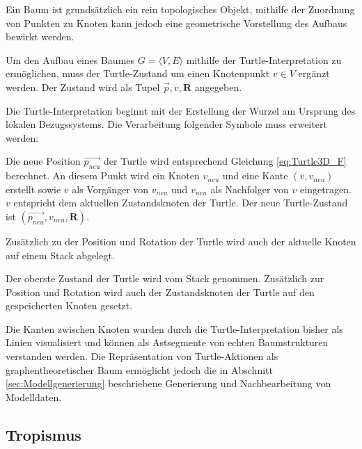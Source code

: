 Ein Baum ist grundsätzlich ein rein topologisches Objekt, mithilfe der Zuordnung von Punkten zu Knoten kann jedoch eine geometrische Vorstellung des Aufbaus bewirkt werden. \cite[S.23]{ABOP:04}

 Um den Aufbau eines Baumes $G = \langle V,E \rangle$ mithilfe der Turtle-Interpretation zu ermöglichen, muss der Turtle-Zustand um einen Knotenpunkt $v \in V$ ergänzt werden. Der Zustand wird als Tupel $\overrightarrow{p}, v, \boldsymbol{R}$ angegeben. 
 
 Die Turtle-Interpretation beginnt mit der Erstellung der Wurzel am Ursprung des lokalen Bezugssystems. Die Verarbeitung folgender Symbole muss erweitert werden:

\begin{description}[labelindent]
		\item[\boldmath$F(l)$]  Die neue Position $\overrightarrow{p_{neu}}$ der Turtle wird entsprechend Gleichung \ref{eq:Turtle3D_F} berechnet. An diesem Punkt wird ein Knoten $v_{neu}$ und eine Kante $(v,v_{neu})$ erstellt sowie $v$ als Vorgänger von $v_{neu}$ und $v_{neu}$ als Nachfolger von $v$ eingetragen. $v$ entspricht dem aktuellen Zustandsknoten der Turtle. Der neue Turtle-Zustand ist $(\overrightarrow{p_{neu}}, v_{neu}, \boldsymbol{R})$.  \\
	
	\item[\boldmath$\textbf{[}$] Zusätzlich zu der Position und Rotation der Turtle wird auch der aktuelle Knoten auf einem Stack abgelegt.\\
	
	\item[\boldmath$\textbf{]}$] Der oberste Zustand der Turtle wird vom Stack genommen. Zusätzlich zur Position und Rotation wird auch der Zustandsknoten der Turtle auf den gespeicherten Knoten gesetzt.\\
\end{description}

Die Kanten zwischen Knoten wurden durch die Turtle-Interpretation bisher als Linien visualisiert und können als Astsegmente von echten Baumstrukturen verstanden werden. \cite[S.23]{ABOP:04} Die Repräsentation von Turtle-Aktionen als graphentheoretischer Baum ermöglicht jedoch die in Abschnitt \ref{sec:Modellgenerierung} beschriebene Generierung und Nachbearbeitung von Modelldaten.

\subsection{Tropismus}

